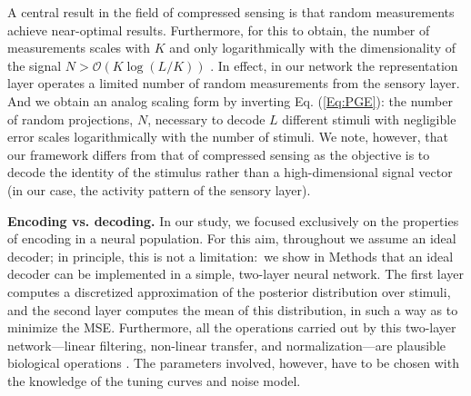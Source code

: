 \documentclass[a4paper]{article}%
\begin{document}
A central result in the field of compressed sensing is that random
measurements achieve near-optimal results. Furthermore, for this to obtain,
the number of measurements scales with
$K$  and only logarithmically with the dimensionality of the signal $N>\mathcal{O}\left(  K\log\left(  L/K\right)
\right) $
\cite[]{Candes2006Near-optimalStrategies,Baraniuk2008AMatrices}. In effect, in
our network the representation layer operates a limited number of random
measurements from the sensory layer. And we obtain an analog scaling form by
inverting Eq. (\ref{Eq:PGE}): the number of random projections, $N$, necessary
to decode $L$ different stimuli with negligible error scales logarithmically
with the number of stimuli. We note, however, that our framework differs from
that of compressed sensing as the objective is to decode the identity of the
stimulus rather than a high-dimensional signal vector (in our case, the
activity pattern of the sensory layer).

\textbf{Encoding vs. decoding.} In our study, we focused exclusively on the
properties of encoding in a neural population. For this aim, throughout we
assume an ideal decoder; in principle, this is not a limitation:\ we show in
Methods that an ideal decoder can be implemented in a simple, two-layer neural
network. The first layer computes a discretized approximation of the posterior
distribution over stimuli, and the second layer computes the mean of this
distribution, in such a way as to minimize the MSE. Furthermore, all the
operations carried out by this two-layer network---linear filtering,
non-linear transfer, and normalization---are plausible biological operations
\cite[]{Deneve1999ReadingObservers,Kouh2008AOperations,Carandini2012NormalizationComputation}. The parameters involved, however, have to be chosen with the knowledge of
the tuning curves and noise model.
\end{document}

